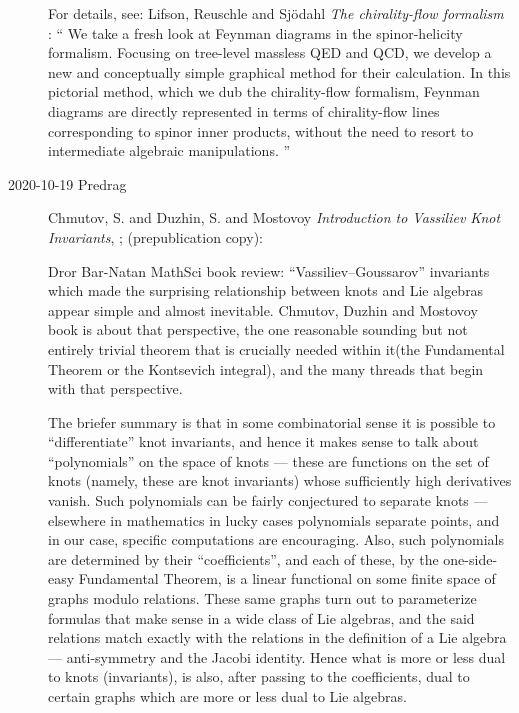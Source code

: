 \begin{description}
For details, see:
Lifson, Reuschle and Sj{\"o}dahl
{\em The chirality-flow formalism} : ``
We take a fresh look at Feynman diagrams in the spinor-helicity
formalism. Focusing on tree-level massless QED and QCD, we develop a new
and conceptually simple graphical method for their calculation. In this
pictorial method, which we dub the chirality-flow formalism, Feynman
diagrams are directly represented in terms of chirality-flow lines
corresponding to spinor inner products, without the need to resort to
intermediate algebraic manipulations. ''

\item[2020-10-19 Predrag]
Chmutov, S. and Duzhin, S. and Mostovoy
{\em Introduction to Vassiliev Knot Invariants},
;
{(prepublication copy)}:

Dror Bar-Natan
{MathSci book review}:
``Vassiliev–Goussarov'' invariants %
which made the surprising relationship between knots and Lie algebras
appear simple and almost inevitable. Chmutov, Duzhin and
Mostovoy book is about that perspective, the one reasonable
sounding but not entirely trivial theorem that is crucially needed within
it(the Fundamental Theorem or the Kontsevich integral), and the many
threads that begin with that perspective.

The briefer summary is that in some combinatorial sense it is possible to
``differentiate'' knot invariants, and hence it makes sense to talk about
``polynomials'' on the space of knots — these are functions on the set of
knots (namely, these are knot invariants) whose sufficiently high
derivatives vanish. Such polynomials can be fairly conjectured to separate
knots — elsewhere in mathematics in lucky cases polynomials separate
points, and in our case, specific computations are encouraging.  Also,
such polynomials are determined by their ``coefficients'', and each
of these, by the one-side-easy Fundamental Theorem, is a linear functional
on some finite space of graphs modulo relations. These same graphs turn
out to parameterize formulas that make sense in a wide class of Lie
algebras, and the said relations match exactly with the relations in the
definition of a Lie algebra — anti-symmetry and the Jacobi identity. Hence
what is more or less dual to knots (invariants), is also, after passing to
the coefficients, dual to certain graphs which are more or less dual to
Lie algebras.



\end{description}


